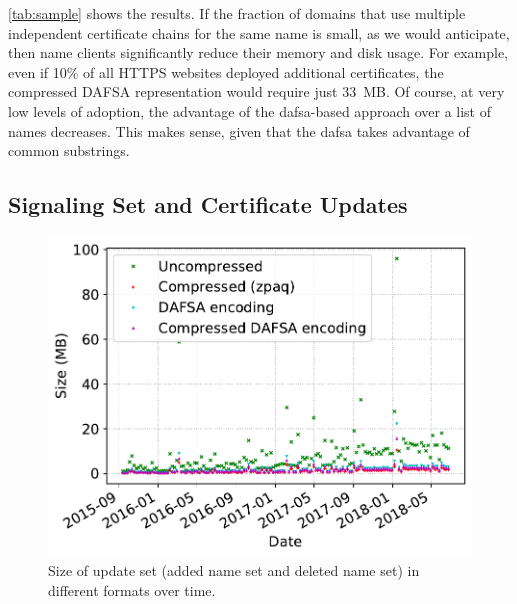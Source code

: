 \autoref{tab:sample} shows the results. If the fraction of domains that use
multiple independent certificate chains for the same name is small, as we would
anticipate, then \ac{name} clients significantly reduce their memory and disk
usage. For example, even if 10\% of all HTTPS websites deployed additional
certificates, the compressed DAFSA representation would require just 33~MB. Of
course, at very low levels of adoption, the advantage of the \ac{dafsa}-based
approach over a list of names decreases. This makes sense, given that the
\ac{dafsa} takes advantage of common substrings.

\subsection{Signaling Set and Certificate Updates}
\label{sec:evaluation:updates}


\begin{figure}[t]
  \centering
  \includegraphics[width=0.95\linewidth]{fig/combined_update_size}
  \vspace{-2mm}
  \caption{Size of update set (added name set and deleted name set) in different
  formats over time.}
  \vspace{-5mm}
  \label{fig:updates}
\end{figure}

